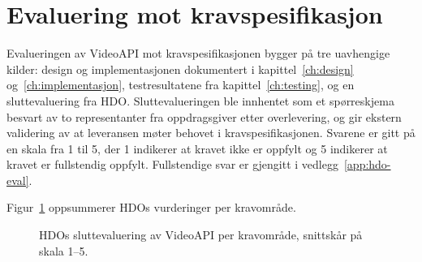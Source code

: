 \section{Evaluering mot kravspesifikasjon}
\label{sec:evaluering}

Evalueringen av VideoAPI mot kravspesifikasjonen bygger på tre
uavhengige kilder: design og implementasjonen dokumentert i 
kapittel~\ref{ch:design} og~\ref{ch:implementasjon}, 
testresultatene fra kapittel~\ref{ch:testing}, og en 
sluttevaluering fra HDO. Sluttevalueringen ble innhentet som et 
spørreskjema besvart av to representanter fra 
oppdragsgiver etter overlevering, og gir ekstern validering av 
at leveransen møter behovet i kravspesifikasjonen. Svarene er gitt på en skala fra 1 til 5, der 1 indikerer at kravet ikke er oppfylt og 5 indikerer at kravet er fullstendig oppfylt. Fullstendige svar er gjengitt i vedlegg~\ref{app:hdo-eval}.

Figur~\ref{fig:hdo-eval-summary} oppsummerer HDOs vurderinger 
per kravområde.

\begin{figure}[h]
    \centering
    
    \caption{HDOs sluttevaluering av VideoAPI per kravområde, 
    snittskår på skala 1--5.}
    \label{fig:hdo-eval-summary}
\end{figure}





